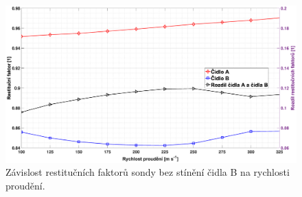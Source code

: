             \begin{figure}[ht!]
                \centering
                \includegraphics*[width=\textwidth, trim={5.9cm 1.0cm 2.7cm 2.0cm}]{400_SIMULACE_KONSTRUKCNICH_UPRAV/Grafy/01_rychlosti.eps}
                \caption{Závislost restitučních faktorů sondy bez stínění čidla B na rychlosti proudění.}
                \label{fig:sonda-bez-stineni-rychlosti}
            \end{figure}

